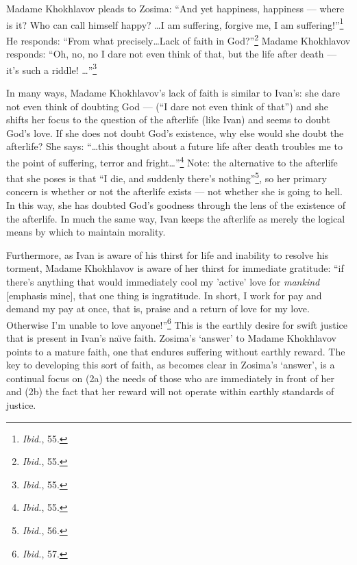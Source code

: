 Madame Khokhlavov pleads to Zosima: ``And yet happiness, happiness --- where is it? Who can call himself happy? \ldots I am suffering, forgive me, I am suffering!''\footnote{\emph{Ibid.}, 55.} He responds: ``From what precisely\ldots Lack of faith in God?''\footnote{\emph{Ibid.}, 55.} Madame Khokhlavov responds: ``Oh, no, no I dare not even think of that, but the life after death --- it's such a riddle! \ldots''\footnote{\emph{Ibid.}, 55.} 

In many ways, Madame Khokhlavov's lack of faith is similar to Ivan's: she dare not even think of doubting God --- (``I dare not even think of that'') and she shifts her focus to the question of the afterlife (like Ivan) and seems to doubt God's love. If she does not doubt God's existence, why else would she doubt the afterlife? She says: ``\ldots this thought about a future life after death troubles me to the point of suffering, terror and fright\ldots''\footnote{\emph{Ibid.}, 55.} Note: the alternative to the afterlife that she poses is that ``I die, and suddenly there's nothing''\footnote{\emph{Ibid.}, 56.}, so her primary concern is whether or not the afterlife exists --- not whether she is going to hell. In this way, she has doubted God's goodness through the lens of the existence of the afterlife. In much the same way, Ivan keeps the afterlife as merely the logical means by which to maintain morality.

 Furthermore, as Ivan is aware of his thirst for life and inability to resolve his torment, Madame Khokhlavov is aware of her thirst for immediate gratitude: ``if there's anything that would immediately cool my 'active' love for \emph{mankind} [emphasis mine], that one thing is ingratitude. In short, I work for pay and demand my pay at once, that is, praise and a return of love for my love. Otherwise I'm unable to love anyone!''\footnote{\emph{Ibid.}, 57.} This is the earthly desire for swift justice that is present in Ivan's na\"{\i}ve faith. Zosima's `answer' to Madame Khokhlavov points to a mature faith, one that endures suffering without earthly reward. The key to developing this sort of faith, as becomes clear in Zosima's `answer', is a continual focus on (2a) the needs of those who are immediately in front of her and (2b) the fact that her reward will not operate within earthly standards of justice.

